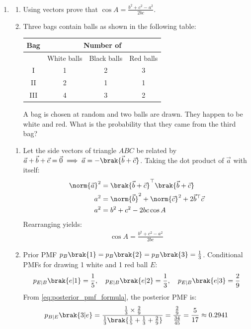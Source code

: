 \begin{enumerate}[label=\thesubsection.\arabic*, ref=\thesubsection.\theenumi]
	\item \hfill {}
	\begin{enumerate}[label=\brak{\alph*}]
		\item Using vectors prove that $\cos A = \frac{b^2 + c^2 - a^2}{2bc}$.
		\item Three bags contain balls as shown in the following table:
		\begin{center}
			\begin{tabular}{|c|c|c|c|}
				\hline
				Bag & \multicolumn{3}{c|}{Number of} \\ \hline
				& White balls & Black balls & Red balls \\ \hline
				I & 1 & 2 & 3 \\
				II & 2 & 1 & 1 \\
				III & 4 & 3 & 2 \\ \hline
			\end{tabular}
		\end{center}
		A bag is chosen at random and two balls are drawn. They happen to be white and red. What is the probability that they came from the third bag?
	\end{enumerate}
	\solution
	\begin{enumerate}[label=\brak{\alph*}]
		\item Let the side vectors of triangle $ABC$ be related by $\vec{a} + \vec{b} + \vec{c} = \vec{0} \implies \vec{a} = -\brak{\vec{b} + \vec{c}}$. Taking the dot product of $\vec{a}$ with itself:
		\begin{align}
			\norm{\vec{a}}^2 &= \brak{\vec{b} + \vec{c}}^{\top}\brak{\vec{b} + \vec{c}} \\
			a^2 &= \norm{\vec{b}}^2 + \norm{\vec{c}}^2 + 2\vec{b}^{\top}\vec{c} \\
			a^2 &= b^2 + c^2 - 2bc\cos A
		\end{align}
		Rearranging yields:
		\begin{align}
			\cos A = \frac{b^2 + c^2 - a^2}{2bc}
		\end{align}
		\item Prior PMF $p_B\brak{1} = p_B\brak{2} = p_B\brak{3} = \frac{1}{3}$.
		Conditional PMFs for drawing 1 white and 1 red ball $E$:
		\begin{align}
			p_{E|B}\brak{e|1} = \frac{1}{5}, \quad p_{E|B}\brak{e|2} = \frac{1}{3}, \quad p_{E|B}\brak{e|3} = \frac{2}{9}
		\end{align}
		From \eqref{eq:posterior_pmf_formula}, the posterior PMF is:
		\begin{align}
			p_{B|E}\brak{3|e} = \frac{\frac{1}{3} \times \frac{2}{9}}{\frac{1}{3}\brak{\frac{1}{5} + \frac{1}{3} + \frac{2}{9}}} = \frac{\frac{2}{9}}{\frac{34}{45}} = \frac{5}{17} \approx 0.2941

\end{align}
\end{enumerate}
\end{enumerate}
